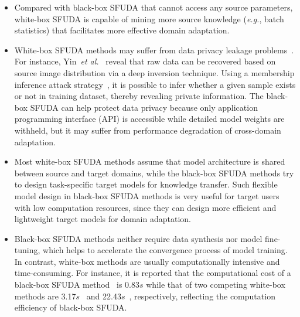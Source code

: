 \documentclass[10pt,journal,compsoc]{IEEEtran}
\def\etal{{\em et al.}}
\def\eg{{\em e.g.}}
\begin{document}
\begin{itemize}[leftmargin=*]%
\item Compared with black-box SFUDA that cannot access any source parameters, white-box SFUDA is capable of mining more source knowledge (\eg, batch statistics) that facilitates more effective domain adaptation.

\item White-box SFUDA methods may suffer from data privacy leakage problems~\cite{zhang2021unsupervised}. 
For instance, Yin~\etal~\cite{yin2020dreaming} %
reveal that raw data can be recovered based on source image distribution via a deep inversion technique. 
Using a membership inference attack strategy~\cite{nasr2019comprehensive, hu2022membership}, it is possible to infer whether a given sample exists or not in training dataset, thereby revealing private information.
The black-box SFUDA can help protect data privacy because only application programming interface (API) is accessible while detailed model weights are withheld, but it may suffer from performance degradation of cross-domain adaptation. %

\item Most white-box SFUDA methods assume that model architecture is shared between source and target domains, while the black-box SFUDA methods try to design task-specific target models for knowledge transfer.
Such flexible model design in black-box SFUDA methods is very useful for target users with low computation resources, since they can design more efficient and lightweight target models for domain adaptation. 

\item Black-box SFUDA methods neither require data synthesis nor model fine-tuning, which helps to accelerate the convergence process of model training. 
In contrast, white-box methods are usually computationally intensive and time-consuming.
For instance, it is reported that the computational cost of a black-box SFUDA method~\cite{zhang2022lightweight} is 0.83$s$ while that of two competing white-box methods are 3.17$s$~\cite{liang2020we} and 22.43$s$~\cite{ahmed2021unsupervised}, respectively, reflecting the computation efficiency of black-box SFUDA.
\end{itemize}
\end{document}
